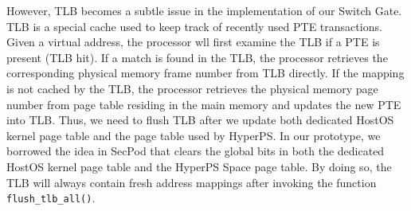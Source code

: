 However, TLB becomes a subtle issue in the implementation of our Switch Gate. TLB is a special cache used to keep track of recently used PTE transactions.
Given a virtual address, the processor wll first examine the TLB if a PTE is present (TLB hit). If a match is found in the TLB, the processor retrieves the corresponding physical memory frame number from TLB directly. If the mapping is not cached by the TLB, the processor retrieves the physical memory page number from page table residing in the main memory and updates the new PTE into TLB. Thus, we need to flush TLB after we update both dedicated HostOS kernel page table and the page table used by HyperPS. 
In our prototype, we borrowed the idea in SecPod that clears the global bits in both the dedicated HostOS kernel page table and the HyperPS Space page table. By doing so, the TLB will always contain fresh address mappings after invoking the function \verb|flush_tlb_all()|.

